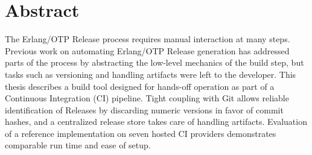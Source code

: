 \cleardoublepage{}

\section*{Abstract}

The Erlang/OTP Release process requires manual interaction at many steps. Previous work on automating Erlang/OTP Release generation has addressed parts of the process by abstracting the low-level mechanics of the build step, but tasks such as versioning and handling artifacts were left to the developer. This thesis describes a build tool designed for hands-off operation as part of a Continuous Integration (CI) pipeline. Tight coupling with Git allows reliable identification of Releases by discarding numeric versions in favor of commit hashes, and a centralized release store takes care of handling artifacts. Evaluation of a reference implementation on seven hosted CI providers demonstrates comparable run time and ease of setup.
